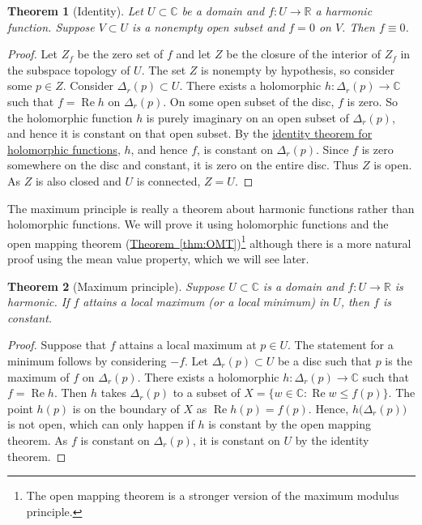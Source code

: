 \documentclass[12pt,openany]{book}
\renewcommand{\Re}{\operatorname{Re}}
\newcommand{\C}{{\mathbb{C}}}
\newcommand{\R}{{\mathbb{R}}}
\theoremstyle{plain}
\newtheorem{thm}{Theorem}[section]
\theoremstyle{remark}
\theoremstyle{definition}
\theoremstyle{exercise}
\theoremstyle{example}
\newcommand{\thmref}[1]{\hyperref[#1]{Theorem~\ref*{#1}}}
\begin{document}
\begin{thm}[Identity]
Let $U \subset \C$ be a domain and $f \colon U \to \R$ a harmonic function.
Suppose $V \subset U$ is a nonempty open subset and $f = 0$ on $V$.  Then $f
\equiv 0$.
\end{thm}

\begin{proof}
Let $Z_f$ be the zero set of $f$ and let $Z$ be the closure of the interior
of $Z_f$ in the subspace topology of $U$.
The set $Z$ is nonempty by hypothesis, so
consider some $p \in Z$.  Consider $\Delta_r(p) \subset U$.
There exists a holomorphic $h \colon \Delta_r(p) \to \C$
such that $f = \Re h$ on $\Delta_r(p)$.
On some open subset of the disc, $f$ is zero.
So the holomorphic function $h$ is purely imaginary on
an open subset of $\Delta_r(p)$, and hence it is constant on that open subset.
By the \hyperref[thm:identity]{identity theorem for holomorphic functions},
$h$, and hence $f$, is constant 
on $\Delta_r(p)$.
Since $f$ is zero somewhere on the
disc and constant, it is zero on the entire disc.
Thus $Z$ is open.
As $Z$ is also closed and $U$ is connected, $Z=U$.
\end{proof}

The maximum principle is really a theorem about harmonic functions rather
than holomorphic functions.  We will prove it using holomorphic functions
and the open mapping theorem (\thmref{thm:OMT})\footnote{%
The open mapping theorem is a stronger version of the maximum modulus principle.}
although there is a more natural proof using the mean value property,
which we will see later.

\begin{thm}[Maximum principle]
%
Suppose $U \subset \C$ is a domain and $f \colon U \to \R$
is harmonic.  If $f$ attains a local maximum (or a local minimum) in $U$, then $f$ is constant.
\end{thm}

\begin{proof}
Suppose that $f$ attains a local maximum at $p \in U$.
The statement for a minimum follows by considering $-f$.
Let $\Delta_r(p) \subset U$
be a disc such that $p$ is the maximum of $f$ on $\Delta_r(p)$.
There exists a holomorphic $h \colon \Delta_r(p) \to \C$
such that $f = \Re h$.
Then $h$ takes
$\Delta_r(p)$ to a subset of $X = \bigl\{ w \in \C : \Re w \leq f(p) \bigr\}$.
The point $h(p)$ is on the boundary of $X$ as $\Re h(p)= f(p)$.  Hence,
$h\bigl(\Delta_r(p)\bigr)$ is not open, which can only happen if $h$ is
constant by the open mapping theorem.  As $f$ is constant on $\Delta_r(p)$, it is constant on $U$ by the
identity theorem.
\end{proof}
\end{document}
